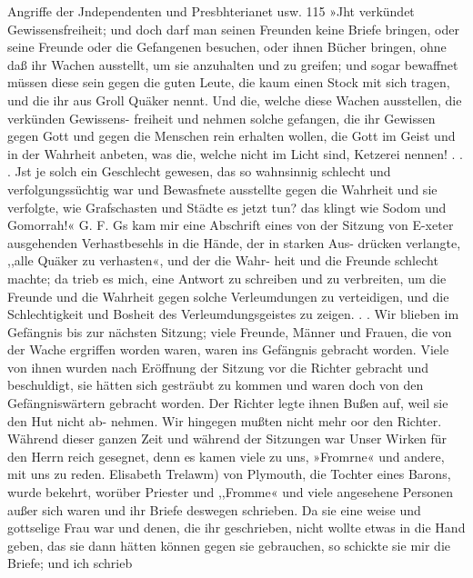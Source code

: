 Angriffe der Jndependenten und Presbhterianet usw. 115
»Jht verkündet Gewissensfreiheit; und doch darf man seinen
Freunden keine Briefe bringen, oder seine Freunde oder die
Gefangenen besuchen, oder ihnen Bücher bringen, ohne daß ihr
Wachen ausstellt, um sie anzuhalten und zu greifen; und sogar
bewaffnet müssen diese sein gegen die guten Leute, die kaum
einen Stock mit sich tragen, und die ihr aus Groll Quäker nennt.
Und die, welche diese Wachen ausstellen, die verkünden Gewissens-
freiheit und nehmen solche gefangen, die ihr Gewissen gegen Gott
und gegen die Menschen rein erhalten wollen, die Gott im Geist
und in der Wahrheit anbeten, was die, welche nicht im Licht sind,
Ketzerei nennen! . . . Jst je solch ein Geschlecht gewesen, das
so wahnsinnig schlecht und verfolgungssüchtig war und Bewasfnete
ausstellte gegen die Wahrheit und sie verfolgte, wie Grafschasten
und Städte es jetzt tun? das klingt wie Sodom und Gomorrah!«
G. F.
Gs kam mir eine Abschrift eines von der Sitzung von E-xeter
ausgehenden Verhastbesehls in die Hände, der in starken Aus-
drücken verlangte, ,,alle Quäker zu verhasten«, und der die Wahr-
heit und die Freunde schlecht machte; da trieb es mich, eine
Antwort zu schreiben und zu verbreiten, um die Freunde und
die Wahrheit gegen solche Verleumdungen zu verteidigen, und
die Schlechtigkeit und Bosheit des Verleumdungsgeistes zu zeigen. . .
Wir blieben im Gefängnis bis zur nächsten Sitzung; viele
Freunde, Männer und Frauen, die von der Wache ergriffen
worden waren, waren ins Gefängnis gebracht worden. Viele
von ihnen wurden nach Eröffnung der Sitzung vor die Richter
gebracht und beschuldigt, sie hätten sich gesträubt zu kommen
und waren doch von den Gefängniswärtern gebracht worden.
Der Richter legte ihnen Bußen auf, weil sie den Hut nicht ab-
nehmen. Wir hingegen mußten nicht mehr oor den Richter.
Während dieser ganzen Zeit und während der Sitzungen war
Unser Wirken für den Herrn reich gesegnet, denn es kamen viele
zu uns, »Fromrne« und andere, mit uns zu reden. Elisabeth
Trelawm) von Plymouth, die Tochter eines Barons, wurde bekehrt,
worüber Priester und ,,Fromme« und viele angesehene Personen
außer sich waren und ihr Briefe deswegen schrieben. Da sie eine
weise und gottselige Frau war und denen, die ihr geschrieben,
nicht wollte etwas in die Hand geben, das sie dann hätten können
gegen sie gebrauchen, so schickte sie mir die Briefe; und ich schrieb
 


